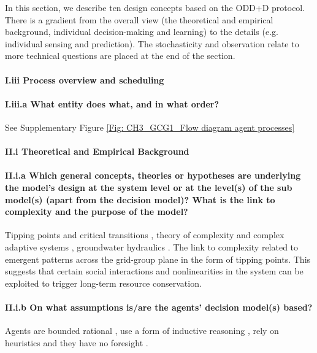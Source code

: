\documentclass[12pt, a4paper]{article}
\begin{document}
In this section, we describe ten design concepts based on the ODD+D protocol. There is a gradient from the overall view (the theoretical and empirical background, individual decision-making and learning) to the details (e.g. individual sensing and prediction). The stochasticity and observation relate to more technical questions are placed at the end of the section.

\paragraph{I.iii Process overview and scheduling}

\paragraph{I.iii.a What entity does what, and in what order?}

See Supplementary Figure \ref{Fig: CH3_GCG1_Flow diagram agent processes}

\paragraph{II.i Theoretical and Empirical Background}

\paragraph{II.i.a Which general concepts, theories or hypotheses are underlying the model's design at the system level or at the level(s) of the sub model(s) (apart from the decision model)? What is the link to complexity and the purpose of the model?}

Tipping points and critical transitions \autocite{Scheffer:2012ct, Scheffer:2001ij,Scheffer:2009gg}, theory of complexity and complex adaptive systems \autocite{Miller:2009uu}, groundwater hydraulics \autocite{Fetter:2001tx}. The link to complexity related to emergent patterns across the grid-group plane in the form of tipping points. This suggests that certain social interactions and nonlinearities in the system can be exploited to trigger long-term resource conservation.

\paragraph{II.i.b On what assumptions is/are the agents' decision model(s) based?}

Agents are bounded rational \autocite{Simon:1955bf}, use a form of inductive reasoning \autocite{Deadman:to}, rely on heuristics \autocite{Ostrom:1994ti} and they have no foresight \autocite{Gigerenzer:2007wy, Gigerenzer:2002tn}.
\end{document}
